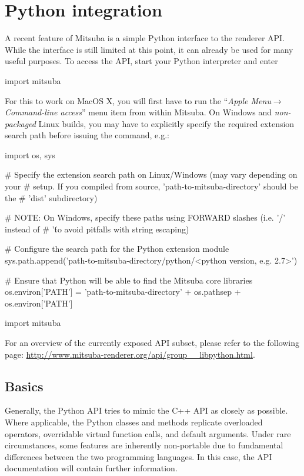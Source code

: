 \section{Python integration}
\label{sec:python}
A recent feature of Mitsuba is a simple Python interface to the renderer API. 
While the interface is still limited at this point, it can already be
used for many useful purposes. To access the API, start your Python 
interpreter and enter
\begin{python}
import mitsuba
\end{python}
For this to work on MacOS X, you will first have to run the ``\emph{Apple
Menu}$\to$\emph{Command-line access}'' menu item from within Mitsuba.
On Windows and \emph{non-packaged} Linux builds, you may have to explicitly
specify the required extension search path before issuing the  command, e.g.:
\begin{python}
import os, sys

# Specify the extension search path on Linux/Windows (may vary depending on your
# setup. If you compiled from  source, 'path-to-mitsuba-directory' should be the
# 'dist' subdirectory)

# NOTE: On Windows, specify these paths using FORWARD slashes (i.e. '/' instead of
# '\' to avoid pitfalls with string escaping)

# Configure the search path for the Python extension module
sys.path.append('path-to-mitsuba-directory/python/<python version, e.g. 2.7>')

# Ensure that Python will be able to find the Mitsuba core libraries
os.environ['PATH'] = 'path-to-mitsuba-directory' + os.pathsep + os.environ['PATH']

import mitsuba
\end{python}

For an overview of the currently exposed API subset, please refer
to the following page: \url{http://www.mitsuba-renderer.org/api/group__libpython.html}.

\subsection{Basics}
Generally, the Python API tries to mimic the C++ API as closely as possible.
Where applicable, the Python classes and methods replicate overloaded operators,
overridable virtual function calls, and default arguments. Under rare circumstances, 
some features are inherently non-portable due to fundamental differences between the 
two programming languages. In this case, the API documentation will contain further
information.

